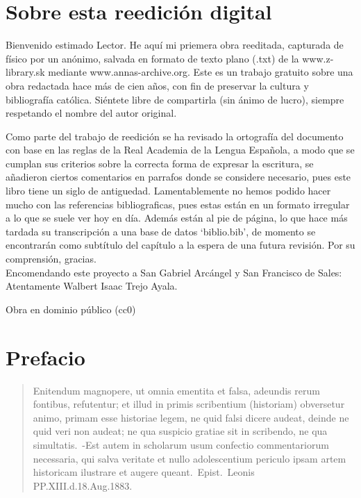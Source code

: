 \raggedbottom{} \documentclass[12pt, a4paper]{book}
\begin{document}
\section{Sobre esta reedición digital} %
Bienvenido estimado Lector. He aquí mi priemera obra reeditada, capturada de físico por un anónimo, salvada en formato de texto plano (.txt) de la www.z-library.sk mediante www.annas-archive.org\@. Este es un trabajo gratuito sobre una obra redactada hace más de cien años, con fin de preservar la cultura y bibliografía católica. Siéntete libre de compartirla (sin ánimo de lucro), siempre respetando el nombre del autor original.

Como parte del trabajo de reedición se ha revisado la ortografía del documento con base en las reglas de la Real Academia de la Lengua Española, a modo que se cumplan sus criterios sobre la correcta forma de expresar la escritura, se añadieron ciertos comentarios en parrafos donde se considere necesario, pues este libro tiene un siglo de antiguedad. Lamentablemente no hemos podido hacer mucho con las referencias bibliograficas, pues estas están en un formato irregular a lo que se suele ver hoy en día. Además están al pie de página, lo que hace más tardada su transcripción a una base de datos `biblio.bib', de momento se encontrarán como subtítulo del capítulo a la espera de una futura revisión. Por su comprensión, gracias.\\
Encomendando este proyecto a San Gabriel Arcángel y San Francisco de Sales: Atentamente Walbert Isaac Trejo Ayala.

Obra en dominio público (cc0)
\section{Prefacio}
\begin{quotation}
  Enitendum magnopere, ut omnia ementita et falsa, adeundis rerum fontibus, refutentur; et illud in primis scribentium (historiam) obversetur animo, primam esse historiae legem, ne quid falsi dicere audeat, deinde ne quid veri non audeat; ne qua suspicio gratiae sit in scribendo, ne qua simultatis.\ -Est autem in scholarum usum confectio commentariorum necessaria, qui salva veritate et nullo adolescentium periculo ipsam artem historicam ilustrare et augere queant.\ Epist.\ Leonis PP.\@ XIII.\@ d.\@ 18.\@ Aug.\@ 1883.
\end{quotation}
\end{document}
